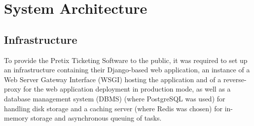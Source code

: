 \documentclass[12pt]{article}
\begin{document}



\newpage
\section{System Architecture} \label{architecture} %

\subsection{Infrastructure} \label{architecture.infrastructure} %


To provide the Pretix Ticketing Software to the public, it was required to set up an infrastructure containing their Django-based web application, an instance 
of a Web Server Gateway Interface (WSGI) hosting the application and of a reverse-proxy for the web application deployment in production mode, as well as a
database management system (DBMS) (where PostgreSQL was used) for handling disk storage and a caching server (where Redis was chosen) for in-memory storage and 
asynchronous queuing of tasks.
\end{document}
